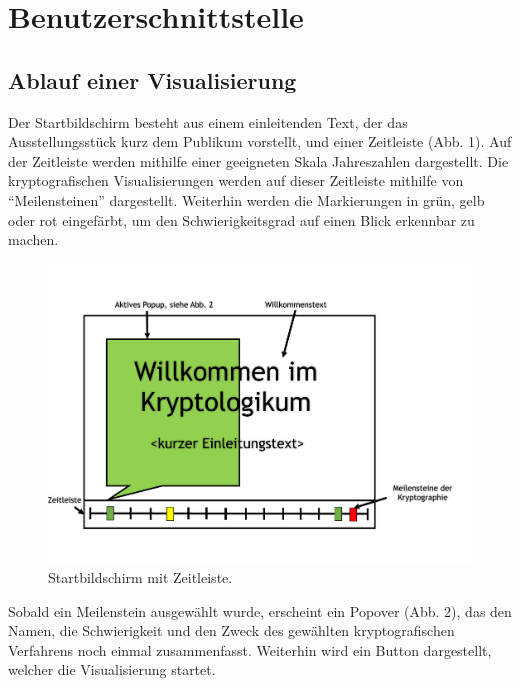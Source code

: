 \documentclass{article}
\begin{document}
\section{Benutzerschnittstelle}

\subsection{Ablauf einer Visualisierung}

Der Startbildschirm besteht aus einem einleitenden Text, der das Ausstellungsstück kurz dem Publikum vorstellt, und einer Zeitleiste (Abb. 1). Auf der Zeitleiste werden mithilfe einer geeigneten Skala Jahreszahlen dargestellt. Die kryptografischen Visualisierungen werden auf dieser Zeitleiste mithilfe von ``Meilensteinen'' dargestellt. Weiterhin werden die Markierungen in grün, gelb oder rot eingefärbt, um den Schwierigkeitsgrad auf einen Blick erkennbar zu machen.

\begin{figure}[H]
  \centering
    \includegraphics[width=\textwidth]{resources/ui_walkthrough_start-draft}
  \caption{Startbildschirm mit Zeitleiste.}
\end{figure}

Sobald ein Meilenstein ausgewählt wurde, erscheint ein Popover (Abb. 2), das den Namen, die Schwierigkeit und den Zweck des gewählten kryptografischen Verfahrens noch einmal zusammenfasst. Weiterhin wird ein Button dargestellt, welcher die Visualisierung startet.
\end{document}
